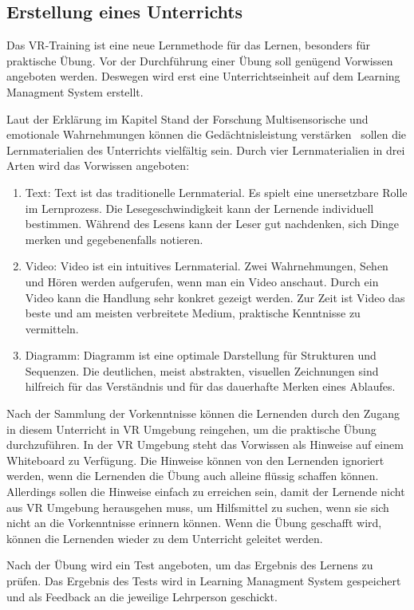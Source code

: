  \subsection{Erstellung eines Unterrichts}
 Das VR-Training ist eine neue Lernmethode für das Lernen, besonders für praktische Übung. Vor der Durchführung einer Übung soll genügend Vorwissen angeboten werden. Deswegen wird erst eine Unterrichtseinheit auf dem Learning Managment System erstellt.

 Laut der Erklärung im Kapitel Stand der Forschung \glqq Multisensorische und emotionale Wahrnehmungen können die Gedächtnisleistung verstärken\grqq\ \citep{11} sollen die Lernmaterialien des Unterrichts vielfältig sein. Durch vier Lernmaterialien in drei Arten wird das Vorwissen angeboten:
 \begin{enumerate}
    \item Text: Text ist das traditionelle Lernmaterial. Es spielt eine unersetzbare Rolle im Lernprozess. Die Lesegeschwindigkeit kann der Lernende individuell bestimmen. Während des Lesens kann der Leser gut nachdenken, sich Dinge merken und gegebenenfalls notieren.
    \item Video: Video ist ein intuitives Lernmaterial. Zwei Wahrnehmungen, Sehen und Hören werden aufgerufen, wenn man ein Video anschaut. Durch ein Video kann die Handlung sehr konkret gezeigt werden. Zur Zeit ist Video das beste und am meisten verbreitete Medium, praktische Kenntnisse zu vermitteln.
    \item Diagramm: Diagramm ist eine optimale Darstellung für Strukturen und Sequenzen. Die deutlichen, meist abstrakten, visuellen Zeichnungen sind hilfreich für das Verständnis und für das dauerhafte Merken eines Ablaufes.
 \end{enumerate}

 Nach der Sammlung der Vorkenntnisse können die Lernenden durch den Zugang in diesem Unterricht in VR Umgebung reingehen, um die praktische Übung durchzuführen. In der VR Umgebung steht das Vorwissen als Hinweise auf einem Whiteboard zu Verfügung. Die Hinweise können von den Lernenden ignoriert werden, wenn die Lernenden die Übung auch alleine flüssig schaffen können. Allerdings sollen die Hinweise einfach zu erreichen sein, damit der Lernende nicht aus VR Umgebung herausgehen muss, um Hilfsmittel zu suchen, wenn sie sich nicht an die Vorkenntnisse erinnern können. Wenn die Übung geschafft wird, können die Lernenden wieder zu dem Unterricht geleitet werden.

 Nach der Übung wird ein Test angeboten, um das Ergebnis des Lernens zu prüfen. Das Ergebnis des Tests wird in Learning Managment System gespeichert und als Feedback an die jeweilige Lehrperson geschickt.
 
